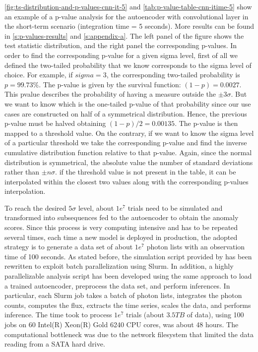 \autoref{fig:ts-distribution-and-p-values-cnn-it-5} and \autoref{tab:p-value-table-cnn-itime-5} show an example of a p-value analysis for the autoencoder with convolutional layer in the short-term scenario (integration time = 5 seconds). More results can be found in \autoref{s:p-values-results} and \autoref{s:appendix-a}. The left panel of the figure shows the test statistic distribution, and the right panel the corresponding p-values. In order to find the corresponding p-value for a given sigma level, first of all we defined the two-tailed probability that we know corresponds to the sigma level of choice. For example, if $sigma=3$, the corresponding two-tailed probability is $p=99.73\%$. The p-value is given by the survival function: $(1-p)=0.0027$. This pvalue describes the probability of having a measure outside the  $\pm3\sigma$. But we want to know which is the one-tailed p-value of that probability since our use cases are constructed on half of a symmetrical distribution. Hence, the previous p-value must be halved obtaining $(1-p)/2=0.00135$. The p-value is then mapped to a threshold value. On the contrary, if we want to know the sigma level of a particular threshold we take the corresponding p-value and find the inverse cumulative distribution function relative to that p-value. Again, since the normal distribution is symmetrical, the absolute value the number of standard deviations rather than  $\pm n\sigma$. if the threshold value is not present in the table, it can be interpolated within the closest two values along with the corresponding p-values interpolation.  

To reach the desired $5\sigma$ level, about $1e^7$ trials need to be simulated and transformed into subsequences fed to the autoencoder to obtain the anomaly scores. Since this process is very computing intensive and has to be repeated several times, each time a new model is deployed in production, the adopted strategy is to generate a data set of about $1e^7$ photon lists with an observation time of 100 seconds. As stated before, the simulation script provided by \cite{dipiano2022ctasagsci} has been rewritten to exploit batch parallelization using Slurm. In addition, a highly parallelizable analysis script has been developed using the same approach to load a trained autoencoder, preprocess the data set, and perform inferences. In particular, each Slurm job takes a batch of photon lists, integrates the photon counts, computes the flux, extracts the time series, scales the data, and performs inference. The time took to process $1e^7$ trials (about $3.5 TB$ of data), using 100 jobs on 60 Intel(R) Xeon(R) Gold 6240 CPU  cores, was about 48 hours. The computational bottleneck was due to the network filesystem that limited the data reading from a SATA hard drive. 

